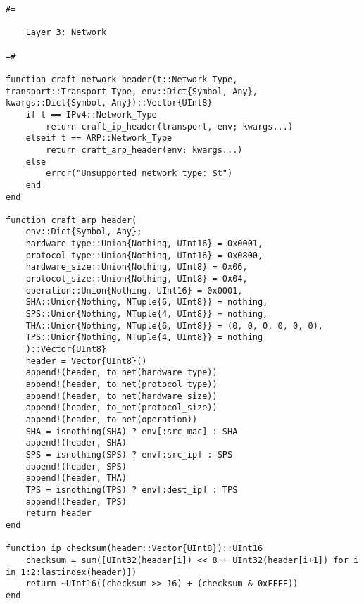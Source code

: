 \begin{lstlisting}[language=JuliaLocal, style=julia]
#=

    Layer 3: Network

=#

function craft_network_header(t::Network_Type, transport::Transport_Type, env::Dict{Symbol, Any}, kwargs::Dict{Symbol, Any})::Vector{UInt8}
    if t == IPv4::Network_Type
        return craft_ip_header(transport, env; kwargs...)
    elseif t == ARP::Network_Type
        return craft_arp_header(env; kwargs...)
    else
        error("Unsupported network type: $t")
    end
end

function craft_arp_header(
    env::Dict{Symbol, Any};
    hardware_type::Union{Nothing, UInt16} = 0x0001,
    protocol_type::Union{Nothing, UInt16} = 0x0800,
    hardware_size::Union{Nothing, UInt8} = 0x06,
    protocol_size::Union{Nothing, UInt8} = 0x04,
    operation::Union{Nothing, UInt16} = 0x0001,
    SHA::Union{Nothing, NTuple{6, UInt8}} = nothing,
    SPS::Union{Nothing, NTuple{4, UInt8}} = nothing,
    THA::Union{Nothing, NTuple{6, UInt8}} = (0, 0, 0, 0, 0, 0),
    TPS::Union{Nothing, NTuple{4, UInt8}} = nothing
    )::Vector{UInt8}
    header = Vector{UInt8}()
    append!(header, to_net(hardware_type))
    append!(header, to_net(protocol_type))
    append!(header, to_net(hardware_size))
    append!(header, to_net(protocol_size))
    append!(header, to_net(operation))
    SHA = isnothing(SHA) ? env[:src_mac] : SHA
    append!(header, SHA)
    SPS = isnothing(SPS) ? env[:src_ip] : SPS
    append!(header, SPS)
    append!(header, THA)
    TPS = isnothing(TPS) ? env[:dest_ip] : TPS
    append!(header, TPS)
    return header
end

function ip_checksum(header::Vector{UInt8})::UInt16
    checksum = sum([UInt32(header[i]) << 8 + UInt32(header[i+1]) for i in 1:2:lastindex(header)])
    return ~UInt16((checksum >> 16) + (checksum & 0xFFFF))
end


\end{lstlisting}
